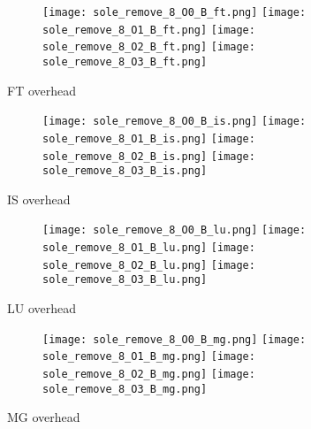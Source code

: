 \documentclass[11pt]{article}
\begin{document}
    \begin{figure}[!ht]
        \begin{subfigure}{\linewidth}
            \texttt{[image: sole\_remove\_8\_O0\_B\_ft.png]}
            \texttt{[image: sole\_remove\_8\_O1\_B\_ft.png]}
            \texttt{[image: sole\_remove\_8\_O2\_B\_ft.png]}
            \texttt{[image: sole\_remove\_8\_O3\_B\_ft.png]}
        \end{subfigure}\par\medskip
        \caption{FT overhead}
    \end{figure}
\begin{figure}[!ht]
        \begin{subfigure}{\linewidth}
            \texttt{[image: sole\_remove\_8\_O0\_B\_is.png]}\hfill
            \texttt{[image: sole\_remove\_8\_O1\_B\_is.png]}\hfill
            \texttt{[image: sole\_remove\_8\_O2\_B\_is.png]}\hfill
            \texttt{[image: sole\_remove\_8\_O3\_B\_is.png]}\hfill
        \end{subfigure}\par\medskip
        \caption{IS overhead}
\end{figure}

    \begin{figure}[!ht]
        \begin{subfigure}{\linewidth}
            \texttt{[image: sole\_remove\_8\_O0\_B\_lu.png]}\hfill
            \texttt{[image: sole\_remove\_8\_O1\_B\_lu.png]}\hfill
            \texttt{[image: sole\_remove\_8\_O2\_B\_lu.png]}\hfill
            \texttt{[image: sole\_remove\_8\_O3\_B\_lu.png]}\hfill
        \end{subfigure}\par\medskip
        \caption{LU overhead}
    \end{figure}

    \begin{figure}[!ht]
        \begin{subfigure}{\linewidth}
            \texttt{[image: sole\_remove\_8\_O0\_B\_mg.png]}\hfill
            \texttt{[image: sole\_remove\_8\_O1\_B\_mg.png]}\hfill
            \texttt{[image: sole\_remove\_8\_O2\_B\_mg.png]}\hfill
            \texttt{[image: sole\_remove\_8\_O3\_B\_mg.png]}\hfill
        \end{subfigure}\par\medskip
        \caption{MG overhead}
    \end{figure}
\end{document}
